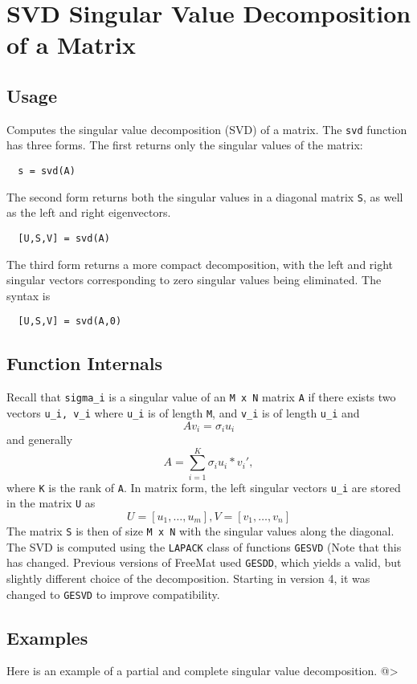 \section{SVD Singular Value Decomposition of a Matrix}

\subsection{Usage}

Computes the singular value decomposition (SVD) of a matrix.  The 
\verb|svd| function has three forms.  The first returns only the singular
values of the matrix:
\begin{verbatim}
  s = svd(A)
\end{verbatim}
The second form returns both the singular values in a diagonal
matrix \verb|S|, as well as the left and right eigenvectors.
\begin{verbatim}
  [U,S,V] = svd(A)
\end{verbatim}
The third form returns a more compact decomposition, with the
left and right singular vectors corresponding to zero singular
values being eliminated.  The syntax is
\begin{verbatim}
  [U,S,V] = svd(A,0)
\end{verbatim}
\subsection{Function Internals}

Recall that \verb|sigma_i| is a singular value of an \verb|M x N|
matrix \verb|A| if there exists two vectors \verb|u_i, v_i| where \verb|u_i| is
of length \verb|M|, and \verb|v_i| is of length \verb|u_i| and
\[
  A v_i = \sigma_i u_i
\]
and generally
\[
  A = \sum_{i=1}^{K} \sigma_i u_i*v_i',
\]
where \verb|K| is the rank of \verb|A|.  In matrix form, the left singular
vectors \verb|u_i| are stored in the matrix \verb|U| as
\[
  U = [u_1,\ldots,u_m], V = [v_1,\ldots,v_n]
\]
The matrix \verb|S| is then of size \verb|M x N| with the singular
values along the diagonal.  The SVD is computed using the 
\verb|LAPACK| class of functions \verb|GESVD| (Note that this has
changed.  Previous versions of FreeMat used \verb|GESDD|, which
yields a valid, but slightly different choice of the decomposition.
Starting in version 4, it was changed to \verb|GESVD| to improve
compatibility.
\subsection{Examples}

Here is an example of a partial and complete singular value
decomposition.
@>
